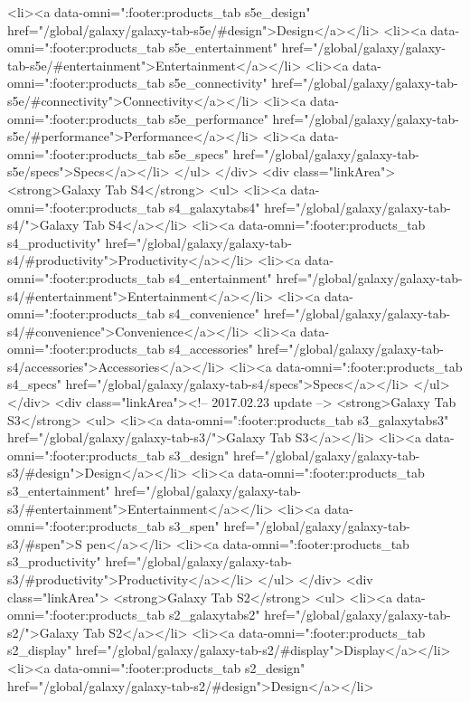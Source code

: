 {{{{{{{{{{{{{{{{{{{{{{{{{{{{{{{{{{{{{{{{{{{{{{{{{{{{{				<li><a data-omni=":footer:products_tab s5e_design" href="/global/galaxy/galaxy-tab-s5e/#design">Design</a></li>
				<li><a data-omni=":footer:products_tab s5e_entertainment" href="/global/galaxy/galaxy-tab-s5e/#entertainment">Entertainment</a></li>
				<li><a data-omni=":footer:products_tab s5e_connectivity" href="/global/galaxy/galaxy-tab-s5e/#connectivity">Connectivity</a></li>
				<li><a data-omni=":footer:products_tab s5e_performance" href="/global/galaxy/galaxy-tab-s5e/#performance">Performance</a></li>
				<li><a data-omni=":footer:products_tab s5e_specs" href="/global/galaxy/galaxy-tab-s5e/specs">Specs</a></li>
			</ul>
		</div>
		<div class="linkArea">
			<strong>Galaxy Tab S4</strong>
			<ul>
				<li><a data-omni=":footer:products_tab s4_galaxytabs4" href="/global/galaxy/galaxy-tab-s4/">Galaxy Tab S4</a></li>
				<li><a data-omni=":footer:products_tab s4_productivity" href="/global/galaxy/galaxy-tab-s4/#productivity">Productivity</a></li>
				<li><a data-omni=":footer:products_tab s4_entertainment" href="/global/galaxy/galaxy-tab-s4/#entertainment">Entertainment</a></li>
				<li><a data-omni=":footer:products_tab s4_convenience" href="/global/galaxy/galaxy-tab-s4/#convenience">Convenience</a></li>
				<li><a data-omni=":footer:products_tab s4_accessories" href="/global/galaxy/galaxy-tab-s4/accessories">Accessories</a></li>
				<li><a data-omni=":footer:products_tab s4_specs" href="/global/galaxy/galaxy-tab-s4/specs">Specs</a></li>
			</ul>
		</div>
		<div class="linkArea"><!-- 2017.02.23 update -->
			<strong>Galaxy Tab S3</strong>
			<ul>
				<li><a data-omni=":footer:products_tab s3_galaxytabs3" href="/global/galaxy/galaxy-tab-s3/">Galaxy Tab S3</a></li>
				<li><a data-omni=":footer:products_tab s3_design" href="/global/galaxy/galaxy-tab-s3/#design">Design</a></li>
				<li><a data-omni=":footer:products_tab s3_entertainment" href="/global/galaxy/galaxy-tab-s3/#entertainment">Entertainment</a></li>
				<li><a data-omni=":footer:products_tab s3_spen" href="/global/galaxy/galaxy-tab-s3/#spen">S pen</a></li>
				<li><a data-omni=":footer:products_tab s3_productivity" href="/global/galaxy/galaxy-tab-s3/#productivity">Productivity</a></li>
			</ul>
		</div>
		<div class="linkArea">
			<strong>Galaxy Tab S2</strong>
			<ul>
				<li><a data-omni=":footer:products_tab s2_galaxytabs2" href="/global/galaxy/galaxy-tab-s2/">Galaxy Tab S2</a></li>
				<li><a data-omni=":footer:products_tab s2_display" href="/global/galaxy/galaxy-tab-s2/#display">Display</a></li>
				<li><a data-omni=":footer:products_tab s2_design" href="/global/galaxy/galaxy-tab-s2/#design">Design</a></li>
}}}}}}}}}}}}}}}}}}}}}}}}}}}}}}}}}}}}}}}}}}}}}}}}}}}}}

